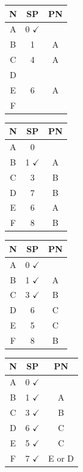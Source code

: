 \documentclass[10pt,landscape]{article}
\begin{document}
\begin{multicols}{2}
\begin{tabular}{ |c|c|c| } 
\hline
N & SP & PN \\
\hline
A & 0 $\checkmark$ &  \\ 
B & 1 & A \\ 
C & 4 & A \\ 
D &  &  \\ 
E & 6 & A \\ 
F &  &  \\
\hline
\end{tabular}
\begin{tabular}{ |c|c|c| } 
\hline
N & SP & PN \\
\hline
A & 0 &  \\ 
B & 1 $\checkmark$ & A \\ 
C & 3 & B \\ 
D & 7 & B \\ 
E & 6 & A \\ 
F & 8 & B \\
\hline
\end{tabular}
\begin{tabular}{ |c|c|c| } 
\hline
N & SP & PN \\
\hline
A & 0 $\checkmark$ &  \\ 
B & 1 $\checkmark$ & A \\ 
C & 3 $\checkmark$ & B \\ 
D & 6 & C \\ 
E & 5 & C \\ 
F & 8 & B \\
\hline
\end{tabular}
\begin{tabular}{ |c|c|c| } 
\hline
N & SP & PN \\
\hline
A & 0 $\checkmark$ &  \\ 
B & 1 $\checkmark$ & A \\ 
C & 3 $\checkmark$ & B \\ 
D & 6 $\checkmark$ & C \\ 
E & 5 $\checkmark$ & C \\ 
F & 7 $\checkmark$ & E or D \\
\hline
\end{tabular}

\end{multicols}
\end{document}
